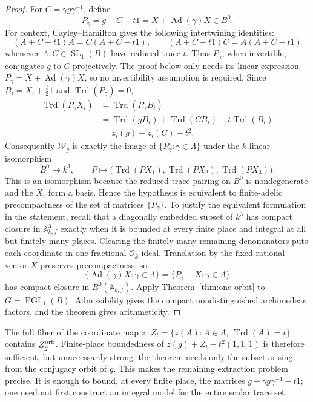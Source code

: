 \documentclass[11pt,reqno]{amsart}
\theoremstyle{definition}
\theoremstyle{remark}
\newcommand{\cO}{\mathcal O}
\newcommand{\Trd}{\operatorname{Trd}}
\newcommand{\SL}{\operatorname{SL}}
\newcommand{\PGL}{\operatorname{PGL}}
\newcommand{\Ad}{\operatorname{Ad}}
\begin{document}
\begin{proof}
For \(C=\gamma g\gamma^{-1}\), define
\[
 P_\gamma=g+C-t1=X+\Ad(\gamma)X\in B^0.
\]
For context, Cayley--Hamilton gives the following intertwining identities:
\[
 (A+C-t1)A=C(A+C-t1),\qquad
 (A+C-t1)C=A(A+C-t1)
\]
whenever \(A,C\in\SL_1(B)\) have reduced trace \(t\).  Thus
\(P_\gamma\), when invertible, conjugates \(g\) to \(C\) projectively.  The
proof below only needs its linear expression
\(P_\gamma=X+\Ad(\gamma)X\), so no invertibility assumption is required.
Since \(B_i=X_i+\frac t2 1\) and
\(\Trd(P_\gamma)=0\),
\[
 \begin{split}
 \Trd(P_\gamma X_i)
 &=\Trd(P_\gamma B_i)\\
 &=\Trd(gB_i)+\Trd(CB_i)-t\Trd(B_i)\\
 &=z_i(g)+z_i(C)-t^2.
 \end{split}
\]
Consequently \(\mathcal W_g\) is exactly the image of
\(\{P_\gamma:\gamma\in\Lambda\}\) under the \(k\)-linear isomorphism
\[
 B^0\longrightarrow k^3,\qquad
 P\longmapsto
 \bigl(\Trd(PX_1),\Trd(PX_2),\Trd(PX_3)\bigr).
\]
This is an isomorphism because the reduced-trace pairing on \(B^0\) is
nondegenerate and the \(X_i\) form a basis.  Hence the hypothesis is
equivalent to finite-adelic precompactness of the set of matrices
\(\{P_\gamma\}\).  To justify the equivalent formulation in the statement,
recall that a diagonally embedded subset of \(k^3\) has compact closure in
\(\mathbb A_{k,f}^3\) exactly when it is bounded at every finite place and
integral at all but finitely many places.  Clearing the finitely many
remaining denominators puts each coordinate in one fractional
\(\cO_k\)-ideal.
Translation by the fixed rational vector \(X\) preserves precompactness, so
\[
 \{\Ad(\gamma)X:\gamma\in\Lambda\}
 =\{P_\gamma-X:\gamma\in\Lambda\}
\]
has compact closure in \(B^0(\mathbb A_{k,f})\).  Apply
Theorem~\ref{thm:one-orbit} to \(G=\PGL_1(B)\).  Admissibility gives the
compact nondistinguished archimedean factors, and the theorem gives
arithmeticity.
\end{proof}

The full fiber of the coordinate map \(z\),
\(Z_t=\{z(A):A\in\Lambda,\ \Trd(A)=t\}\) contains
\(Z_g^{\rm orb}\).  Finite-place boundedness of
\(z(g)+Z_t-t^2(1,1,1)\) is therefore sufficient, but unnecessarily strong:
the theorem needs only the subset arising from the conjugacy orbit of \(g\).
This makes the remaining extraction problem precise.  It is enough to bound,
at every finite place, the matrices
\(g+\gamma g\gamma^{-1}-t1\); one need not first construct an integral model
for the entire scalar trace set.
\end{document}
